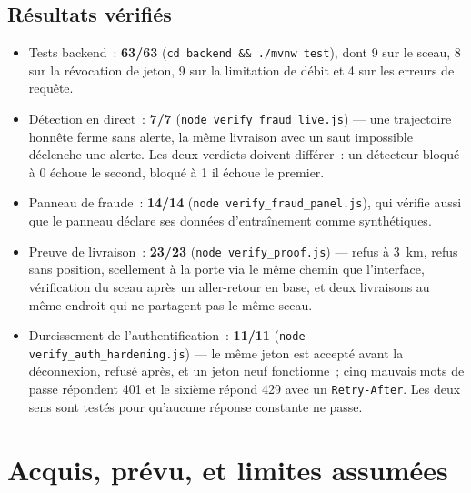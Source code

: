 \documentclass[11pt,a4paper]{article}
\begin{document}
\subsection{R\'esultats v\'erifi\'es}
\begin{itemize}[leftmargin=1.4em]
  \item Tests backend~: \textbf{63/63} (\texttt{cd backend \&\& ./mvnw test}), dont 9 sur le sceau, 8 sur la r\'evocation de jeton, 9 sur la limitation de d\'ebit et 4 sur les erreurs de requ\^ete.
  \item D\'etection en direct~: \textbf{7/7} (\texttt{node verify\_fraud\_live.js}) --- une trajectoire honn\^ete ferme sans alerte, la m\^eme livraison avec un saut impossible d\'eclenche une alerte. Les deux verdicts doivent diff\'erer~: un d\'etecteur bloqu\'e \`a 0 \'echoue le second, bloqu\'e \`a 1 il \'echoue le premier.
  \item Panneau de fraude~: \textbf{14/14} (\texttt{node verify\_fraud\_panel.js}), qui v\'erifie aussi que le panneau d\'eclare ses donn\'ees d'entra\^inement comme synth\'etiques.
  \item Preuve de livraison~: \textbf{23/23} (\texttt{node verify\_proof.js}) --- refus \`a 3~km, refus sans position, scellement \`a la porte via le m\^eme chemin que l'interface, v\'erification du sceau apr\`es un aller-retour en base, et deux livraisons au m\^eme endroit qui ne partagent pas le m\^eme sceau.
  \item Durcissement de l'authentification~: \textbf{11/11} (\texttt{node verify\_auth\_hardening.js}) --- le m\^eme jeton est accept\'e avant la d\'econnexion, refus\'e apr\`es, et un jeton neuf fonctionne~; cinq mauvais mots de passe r\'epondent 401 et le sixi\`eme r\'epond 429 avec un \texttt{Retry-After}. Les deux sens sont test\'es pour qu'aucune r\'eponse constante ne passe.
\end{itemize}

\section{Acquis, pr\'evu, et limites assum\'ees}
\end{document}
